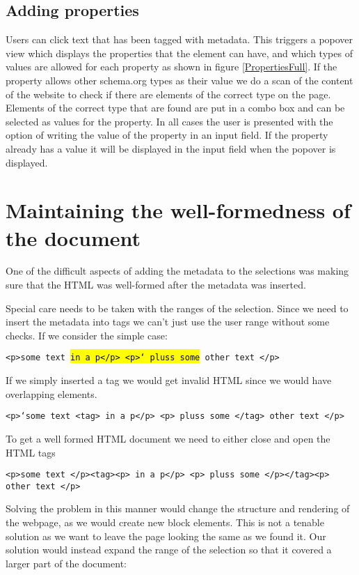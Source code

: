 \subsection{Adding properties}

Users can click text that has been tagged with metadata.
This triggers a popover view which displays the properties that the element can have,
and which types of values are allowed for each property as shown in figure \ref{PropertiesFull}.
If the property allows other schema.org types as their value we do a scan of the content of the website to check if
there are elements of the correct type on the page.
Elements of the correct type that are found are put in a combo box and can be selected as values for the property.
In all cases the user is presented with the option of writing the value of the property in an input field.
If the property already has a value it will be displayed in the input field when the popover is displayed.


\section{Maintaining the well-formedness of the document}
One of the difficult aspects of adding the metadata to the selections was making sure that the HTML was well-formed
after the metadata was inserted.

Special care needs to be taken with the ranges of the selection.
Since we need to insert the metadata into tags we can't just use the user range without some checks.
If we consider the simple case:

\texttt{<p>some text \hl{in a p</p> <p>` pluss some} other text </p>}

If we simply inserted a tag we would get invalid HTML since we would have overlapping elements.

\texttt{<p>`some text <tag> in a p</p> <p> pluss some </tag>  other text </p>}

To get a well formed HTML document we need to either close and open the HTML tags

\texttt{<p>some text </p><tag><p> in a p</p> <p> pluss some </p></tag><p>  other text </p>}

Solving the problem in this manner would change the structure and rendering of the webpage,
as we would create new block elements.
This is not a tenable solution as we want to leave the page looking the same as we found it.
Our solution would instead expand the range of the selection so that it covered a larger part of the document:

